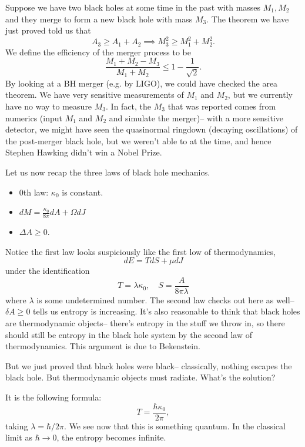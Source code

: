 Suppose we have two black holes at some time in the past with masses $M_1,M_2$ and they merge to form a new black hole with mass $M_3$. The theorem we have just proved told us that
\begin{equation}
    A_3 \geq A_1 +A_2 \implies M_3^2 \geq M_1^2 +M_2^2.
\end{equation}
We define the efficiency of the merger process to be
\begin{equation}
    \frac{M_1+M_2 -M_3}{M_1+M_2} \leq 1-\frac{1}{\sqrt{2}}.
\end{equation}
By looking at a BH merger (e.g. by LIGO), we could have checked the area theorem. We have very sensitive measurements of $M_1$ and $M_2$, but we currently have no way to measure $M_3$. In fact, the $M_3$ that was reported comes from numerics (input $M_1$ and $M_2$ and simulate the merger)-- with a more sensitive detector, we might have seen the quasinormal ringdown (decaying oscillations) of the post-merger black hole, but we weren't able to at the time, and hence Stephen Hawking didn't win a Nobel Prize.

Let us now recap the three laws of black hole mechanics.
\begin{itemize}
    \item 0th law: $\kappa_0$ is constant.
    \item $dM=\frac{\kappa_0}{8\pi} dA + \Omega dJ$
    \item $\Delta A \geq 0$.
\end{itemize}
Notice the first law looks suspiciously like the first low of thermodynamics,
\begin{equation}
    dE = TdS + \mu dJ
\end{equation}
under the identification 
\begin{equation}
    T=\lambda \kappa_0, \quad S=\frac{A}{8\pi \lambda}
\end{equation}
where $\lambda$ is some undetermined number. The second law checks out here as well-- $\delta A \geq 0$ tells us entropy is increasing. It's also reasonable to think that black holes are thermodynamic objects-- there's entropy in the stuff we throw in, so there should still be entropy in the black hole system by the second law of thermodynamics. This argument is due to Bekenstein.

But we just proved that black holes were black-- classically, nothing escapes the black hole. But thermodynamic objects must radiate. What's the solution?

It is the following formula:
\begin{equation}
    T=\frac{\hbar \kappa_0}{2\pi},
\end{equation}
taking $\lambda=\hbar/2\pi$. We see now that this is something quantum. In the classical limit as $\hbar \to 0$, the entropy becomes infinite.

